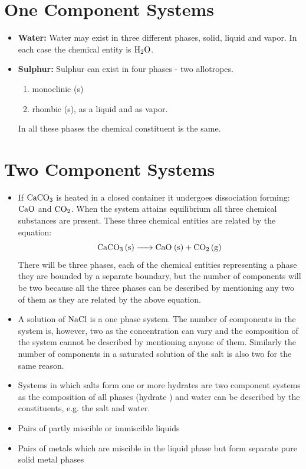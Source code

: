 \documentclass[a4paper,12pt,twocolumn]{article}
\begin{document}
\section{One Component Systems}
\begin{itemize}
\item \textbf{Water:} Water may exist in three different phases, solid, liquid and vapor. In each case the chemical entity is $\ce{H2O}$. 
\item \textbf{Sulphur:} Sulphur can exist in four phases - two allotropes.
\begin{enumerate}
\item monoclinic (s)
\item rhombic (s), as a liquid and as vapor.
\end{enumerate}
In all these phases the chemical constituent is the same. 
\end{itemize}

\section{Two Component Systems}
\begin{itemize}
\item If $\ce{CaCO3}$ is heated in a closed container it undergoes dissociation forming: $\ce{CaO}$ and $\ce{CO2}$. When the system attains equilibrium all three chemical substances are present. These three chemical entities are related by the equation:
$$\ce{CaCO3 (s) -> CaO (s) + CO2 (g)}$$
There will be three phases, each of the chemical entities representing a phase they are bounded by a separate boundary, but the number of components will be two because all the three phases can be described by mentioning any two of them as they are related by the above equation. 
\item A solution of $\ce{NaCl}$ is a one phase system. The number of components in the system is, however, two as the concentration can vary and the composition of the system cannot be described by mentioning anyone of them. Similarly the number of components in a saturated solution of the salt is also two for the same reason. 
\item Systems in which salts form one or more hydrates are two component systems as the composition of all phases (hydrate ) and water can be described by the constituents, e.g. the salt and water.
\item Pairs of partly miscible or immiscible liquids
\item Pairs of metals which are miscible in the liquid phase but form separate pure solid metal phases
\end{itemize}
\end{document}
